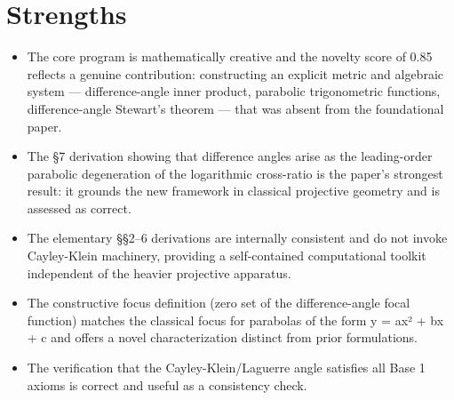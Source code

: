 \documentclass[11pt]{article}
\begin{document}
\section*{Strengths}
\begin{itemize}[leftmargin=*]
  \item The core program is mathematically creative and the novelty score of 0.85 reflects a genuine contribution: constructing an explicit metric and algebraic system — difference-angle inner product, parabolic trigonometric functions, difference-angle Stewart's theorem — that was absent from the foundational paper.
  \item The §7 derivation showing that difference angles arise as the leading-order parabolic degeneration of the logarithmic cross-ratio is the paper's strongest result: it grounds the new framework in classical projective geometry and is assessed as correct.
  \item The elementary §§2–6 derivations are internally consistent and do not invoke Cayley-Klein machinery, providing a self-contained computational toolkit independent of the heavier projective apparatus.
  \item The constructive focus definition (zero set of the difference-angle focal function) matches the classical focus for parabolas of the form y = ax² + bx + c and offers a novel characterization distinct from prior formulations.
  \item The verification that the Cayley-Klein/Laguerre angle satisfies all Base 1 axioms is correct and useful as a consistency check.
\end{itemize}
\end{document}
